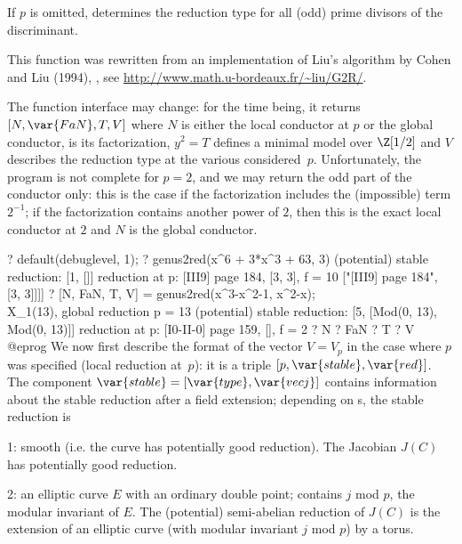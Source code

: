 If $p$ is omitted, determines the reduction type for all (odd) prime
divisors of the discriminant.

\noindent This function was rewritten from an implementation of Liu's
algorithm by Cohen and Liu (1994), , see
\url{http://www.math.u-bordeaux.fr/~liu/G2R/}.

 The function interface may change: for the
time being, it returns $[N,\var{FaN}, T, V]$
where $N$ is either the local conductor at $p$ or the
global conductor,  is its factorization, $y^2 = T$ defines a
minimal model over $\Z[1/2]$ and $V$ describes the reduction type at the
various considered~$p$. Unfortunately, the program is not complete for
$p = 2$, and we may return the odd part of the conductor only: this is the
case if the factorization includes the (impossible) term $2^{-1}$; if the
factorization contains another power of $2$, then this is the exact local
conductor at $2$ and $N$ is the global conductor.

\bprog
? default(debuglevel, 1);
? genus2red(x^6 + 3*x^3 + 63, 3)
(potential) stable reduction: [1, []]
reduction at p: [III{9}] page 184, [3, 3], f = 10
       ["[III{9}] page 184", [3, 3]]]]
? [N, FaN, T, V] = genus2red(x^3-x^2-1, x^2-x);  \\ X_1(13), global reduction
p = 13
(potential) stable reduction: [5, [Mod(0, 13), Mod(0, 13)]]
reduction at p: [I{0}-II-0] page 159, [], f = 2
? N
? FaN
? T
? V
@eprog\noindent
We now first describe the format of the vector $V = V_p$ in the case where
$p$ was specified (local reduction at~$p$): it is a triple $[p, \var{stable},
\var{red}]$. The component $\var{stable} = [\var{type}, \var{vecj}]$ contains
information about the stable reduction after a field extension;
depending on s, the stable reduction is

\item 1: smooth (i.e. the curve has potentially good reduction). The
      Jacobian $J(C)$ has potentially good reduction.

\item 2: an elliptic curve $E$ with an ordinary double point; 
contains $j$ mod $p$, the modular invariant of $E$. The (potential)
semi-abelian reduction of $J(C)$ is the extension of an elliptic curve (with
modular invariant $j$ mod $p$) by a torus.

